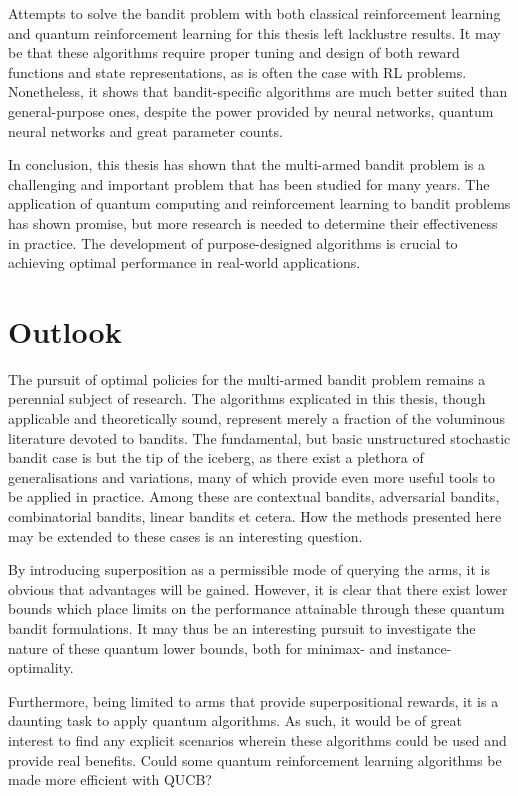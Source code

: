 Attempts to solve the bandit problem with both classical reinforcement learning and quantum reinforcement learning for this thesis left lacklustre results.
It may be that these algorithms require proper tuning and design of both reward functions and state representations, as is often the case with RL problems.
Nonetheless, it shows that bandit-specific algorithms are much better suited than general-purpose ones, despite the power provided by neural networks, quantum neural networks and great parameter counts.

In conclusion, this thesis has shown that the multi-armed bandit problem is a challenging and important problem that has been studied for many years.
The application of quantum computing and reinforcement learning to bandit problems has shown promise, but more research is needed to determine their effectiveness in practice.
The development of purpose-designed algorithms is crucial to achieving optimal performance in real-world applications.

\section{Outlook}
The pursuit of optimal policies for the multi-armed bandit problem remains a perennial subject of research.
The algorithms explicated in this thesis, though applicable and theoretically sound, represent merely a fraction of the voluminous literature devoted to bandits.
The fundamental, but basic unstructured stochastic bandit case is but the tip of the iceberg, as there exist a plethora of generalisations and variations, many of which provide even more useful tools to be applied in practice.
Among these are contextual bandits, adversarial bandits, combinatorial bandits, linear bandits et cetera.
How the methods presented here may be extended to these cases is an interesting question.

By introducing superposition as a permissible mode of querying the arms, it is obvious that advantages will be gained.
However, it is clear that there exist lower bounds which place limits on the performance attainable through these quantum bandit formulations.
It may thus be an interesting pursuit to investigate the nature of these quantum lower bounds, both for minimax- and instance-optimality.

Furthermore, being limited to arms that provide superpositional rewards, it is a daunting task to apply quantum algorithms.
As such, it would be of great interest to find any explicit scenarios wherein these algorithms could be used and provide real benefits.
Could some quantum reinforcement learning algorithms be made more efficient with QUCB?


